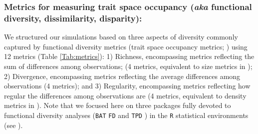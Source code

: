 \documentclass[12pt,letterpaper]{article}
\begin{document}
\subsubsection{Metrics for measuring trait space occupancy (\textit{aka} functional diversity, dissimilarity, disparity):}

We structured our simulations based on three aspects of diversity commonly captured by functional diversity metrics (trait space occupancy metrics; \cite{mammola2021concepts}) using 12 metrics (Table \ref{Tab:metrics}):
1) Richness, encompassing metrics reflecting the sum of differences among observations; (4 metrics, equivalent to size metrics in \citealt{guillerme2020shifting});
2) Divergence, encompassing metrics reflecting the average differences among observations (4 metrics); and
3) Regularity, encompassing metrics reflecting how regular the differences among observations are (4 metrics, equivalent to density metrics in \citealt{guillerme2020shifting}).
Note that we focused here on three packages fully devoted to functional diversity analyses (\texttt{BAT} \citealt{cardoso2015bat} \texttt{FD} \citealt{Laliberte2010FD} and \texttt{TPD} \citealt{carmona2019trait}) in the \texttt{R} statistical environments (see \citealt{mammola2021concepts}).
\end{document}
